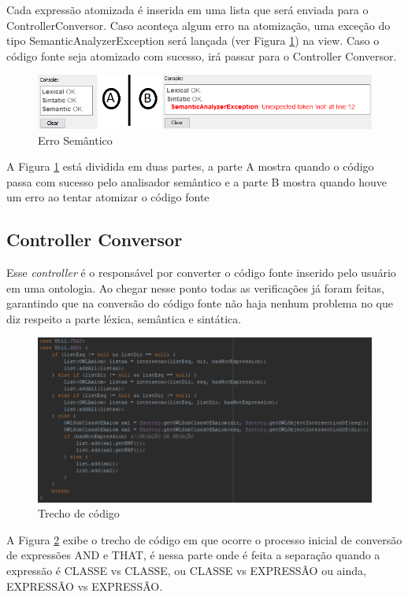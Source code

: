 \documentclass{bcc}
\begin{document}
Cada expressão atomizada é inserida em uma lista que será enviada para o ControllerConversor. Caso aconteça algum erro na atomização, uma exceção do tipo SemanticAnalyzerException será lançada (ver Figura \ref{fig:codigoErroSemantico}) na view. Caso o código fonte seja atomizado com sucesso, irá passar para o Controller Conversor.

\begin{figure}[H]
\centering
\includegraphics[width=.7\textwidth]{Figuras/codigo_erro_semantico.png}
\caption{Erro Semântico}
\label{fig:codigoErroSemantico}
\end{figure}

A Figura \ref{fig:codigoErroSemantico} está dividida em duas partes, a parte A mostra quando o código passa com sucesso pelo analisador semântico e a parte B mostra quando houve um erro ao tentar atomizar o código fonte


\subsection{Controller Conversor}

Esse \textit{controller} é o responsável por converter o código fonte inserido pelo usuário em uma ontologia. Ao chegar nesse ponto todas as verificações já foram feitas, garantindo que na conversão do código fonte não haja nenhum problema no que diz respeito a parte léxica, semântica e sintática.

\begin{figure}[H]
\centering
\includegraphics[width=.8\textwidth]{Figuras/codigo_conversor_andthat.png}
\caption{Trecho de código} 
\label{fig:codigoConversor}
\end{figure}

A Figura \ref{fig:codigoConversor} exibe o trecho de código em que ocorre o processo inicial de conversão de expressões AND e THAT, é nessa parte onde é feita a separação quando a expressão é CLASSE vs CLASSE, ou CLASSE vs EXPRESSÃO ou ainda, EXPRESSÃO vs EXPRESSÃO.
\end{document}
